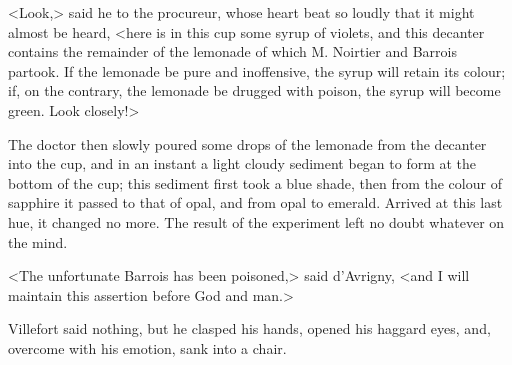  <Look,> said he to the procureur, whose heart beat so loudly that it might almost be heard, <here is in this cup some syrup of violets, and this decanter contains the remainder of the lemonade of which M. Noirtier and Barrois partook. If the lemonade be pure and inoffensive, the syrup will retain its colour; if, on the contrary, the lemonade be drugged with poison, the syrup will become green. Look closely!> 

 The doctor then slowly poured some drops of the lemonade from the decanter into the cup, and in an instant a light cloudy sediment began to form at the bottom of the cup; this sediment first took a blue shade, then from the colour of sapphire it passed to that of opal, and from opal to emerald. Arrived at this last hue, it changed no more. The result of the experiment left no doubt whatever on the mind. 

 <The unfortunate Barrois has been poisoned,> said d'Avrigny, <and I will maintain this assertion before God and man.> 

 Villefort said nothing, but he clasped his hands, opened his haggard eyes, and, overcome with his emotion, sank into a chair. 